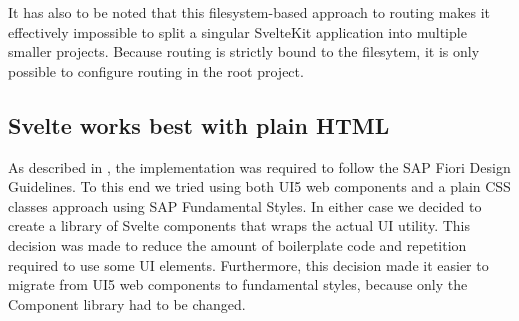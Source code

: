 It has also to be noted that this filesystem-based approach to routing makes it effectively impossible to split a singular SvelteKit application into multiple smaller projects. Because routing is strictly bound to the filesytem, it is only possible to configure routing in the root project.



\subsection{Svelte works best with plain HTML}
\label{sec:evaluation-ui-libs}
As described in , the implementation was required to follow the SAP Fiori Design Guidelines. To this end we tried using both UI5 web components and a plain CSS classes approach using SAP Fundamental Styles. In either case we decided to create a library of Svelte components that wraps the actual UI utility. This decision was made to reduce the amount of boilerplate code and repetition required to use some UI elements. Furthermore, this decision made it easier to migrate from UI5 web components to fundamental styles, because only the Component library had to be changed. 






